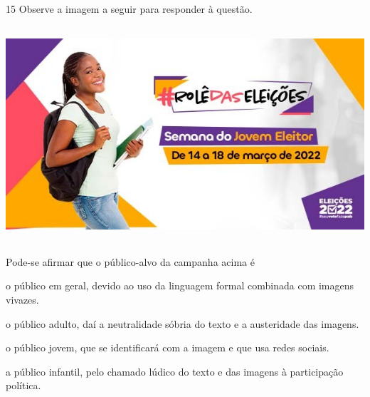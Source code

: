 \num{15} Observe a imagem a seguir para responder à questão.

\includegraphics[width=5.90551in,height=3.15278in]{./imgSAEB_7_POR/media/image20.png}


Pode-se afirmar que o público-alvo da campanha acima é

\begin{escolha}

    \item o público em geral, devido ao uso da linguagem formal combinada com imagens vivazes.
    
    \item o público adulto, daí a neutralidade sóbria do texto e a austeridade das imagens. 
    
    \item o público jovem, que se identificará com a imagem e que usa redes sociais.  
    
    \item a público infantil, pelo chamado lúdico do texto e das imagens à participação política. 

\end{escolha}



